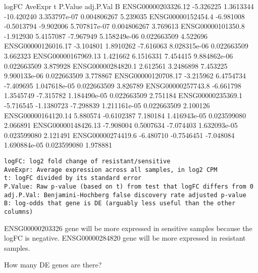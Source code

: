 \documentclass[
]{article}
\newenvironment{Shaded}{\begin{snugshade}}{\end{snugshade}}
\newcommand{\FloatTok}[1]{\textcolor[rgb]{0.00,0.00,0.81}{#1}}
\newcommand{\FunctionTok}[1]{\textcolor[rgb]{0.13,0.29,0.53}{\textbf{#1}}}
\newcommand{\NormalTok}[1]{#1}
\newcommand{\SpecialCharTok}[1]{\textcolor[rgb]{0.81,0.36,0.00}{\textbf{#1}}}
\begin{document}
\begin{Shaded}
\begin{Highlighting}[]
\NormalTok{                      logFC    AveExpr          t      P.Value   adj.P.Val        B}
\NormalTok{ENSG00000203326.12 {-}5.326225  1.3613344 {-}10.420240 3.353797e{-}07 0.004806267 5.239035}
\NormalTok{ENSG00000152454.4  {-}6.981008 {-}0.5013794  {-}9.902006 5.707817e{-}07 0.004806267 3.769613}
\NormalTok{ENSG00000101350.8  {-}1.912930  5.4157087  {-}7.967949 5.158249e{-}06 0.022663509 4.522696}
\NormalTok{ENSG00000126016.17 {-}3.104801  1.8910262  {-}7.616063 8.028315e{-}06 0.022663509 3.662323}
\NormalTok{ENSG00000167969.13  1.421662  6.1516331   7.454415 9.884862e{-}06 0.022663509 3.879928}
\NormalTok{ENSG00000284820.1   2.612561  3.2486898   7.453225 9.900133e{-}06 0.022663509 3.778867}
\NormalTok{ENSG00000120708.17 {-}3.215962  6.4754734  {-}7.409695 1.047618e{-}05 0.022663509 3.826789}
\NormalTok{ENSG00000257743.8  {-}6.661798  1.3545749  {-}7.315782 1.184490e{-}05 0.022663509 2.751184}
\NormalTok{ENSG00000235369.1  {-}5.716545 {-}1.1380723  {-}7.298839 1.211161e{-}05 0.022663509 2.100126}
\NormalTok{ENSG00000164120.14  5.880574 {-}0.6102387   7.180184 1.416943e{-}05 0.023599080 2.066891}
\NormalTok{ENSG00000148426.13 {-}7.908004  0.5007634  {-}7.074403 1.632093e{-}05 0.023599080 2.121491}
\NormalTok{ENSG00000274419.6  {-}6.480710 {-}0.7546451  {-}7.048084 1.690884e{-}05 0.023599080 1.978881}
\end{Highlighting}
\end{Shaded}

\begin{verbatim}
logFC: log2 fold change of resistant/sensitive
AveExpr: Average expression across all samples, in log2 CPM
t: logFC divided by its standard error
P.Value: Raw p-value (based on t) from test that logFC differs from 0
adj.P.Val: Benjamini-Hochberg false discovery rate adjusted p-value
B: log-odds that gene is DE (arguably less useful than the other columns)
\end{verbatim}

ENSG00000203326 gene will be more expressed in sensitive samples because
the logFC is negative. ENSG00000284820 gene will be more expressed in
resistant samples.

How many DE genes are there?

\begin{Shaded}
\end{Shaded}
\end{document}
